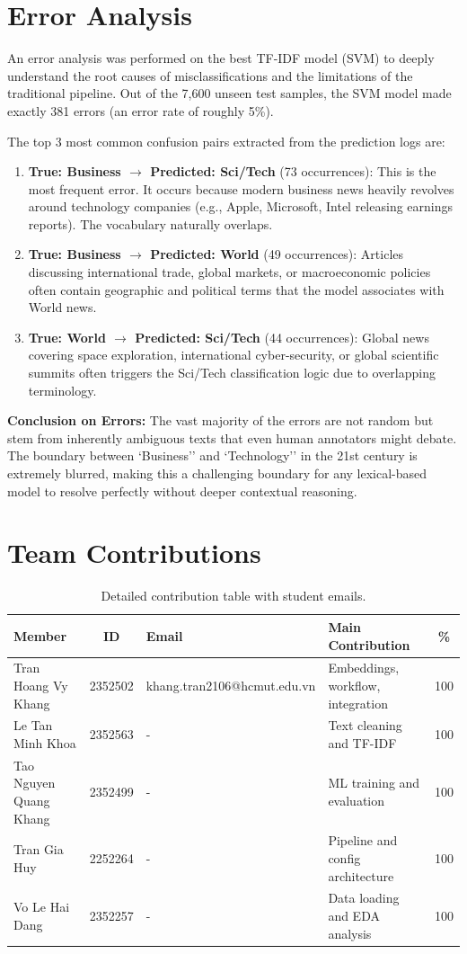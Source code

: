 \documentclass[a4paper,12pt]{article}
\begin{document}
\section{Error Analysis}
An error analysis was performed on the best TF-IDF model (SVM) to deeply understand the root causes of misclassifications and the limitations of the traditional pipeline. Out of the 7,600 unseen test samples, the SVM model made exactly 381 errors (an error rate of roughly 5\%).

The top 3 most common confusion pairs extracted from the prediction logs are:
\begin{enumerate}
    \item \textbf{True: Business $\rightarrow$ Predicted: Sci/Tech} (73 occurrences): This is the most frequent error. It occurs because modern business news heavily revolves around technology companies (e.g., Apple, Microsoft, Intel releasing earnings reports). The vocabulary naturally overlaps.
    \item \textbf{True: Business $\rightarrow$ Predicted: World} (49 occurrences): Articles discussing international trade, global markets, or macroeconomic policies often contain geographic and political terms that the model associates with World news.
    \item \textbf{True: World $\rightarrow$ Predicted: Sci/Tech} (44 occurrences): Global news covering space exploration, international cyber-security, or global scientific summits often triggers the Sci/Tech classification logic due to overlapping terminology.
\end{enumerate}

\textbf{Conclusion on Errors:} The vast majority of the errors are not random but stem from inherently ambiguous texts that even human annotators might debate. The boundary between `Business'' and `Technology'' in the 21st century is extremely blurred, making this a challenging boundary for any lexical-based model to resolve perfectly without deeper contextual reasoning.


\section{Team Contributions}
\begin{table}[H]
\centering
\begin{tabularx}{\linewidth}{l c l X c}
\toprule
Member & ID & Email & Main Contribution & \% \\
\midrule
Tran Hoang Vy Khang & 2352502 & khang.tran2106@hcmut.edu.vn & Embeddings, workflow, integration & 100 \\
Le Tan Minh Khoa & 2352563 & - & Text cleaning and TF-IDF & 100 \\
Tao Nguyen Quang Khang & 2352499 & - & ML training and evaluation & 100 \\
Tran Gia Huy & 2252264 & - & Pipeline and config architecture & 100 \\
Vo Le Hai Dang & 2352257 & - & Data loading and EDA analysis & 100 \\
\bottomrule
\end{tabularx}
\caption{Detailed contribution table with student emails.}
\end{table}
\end{document}
